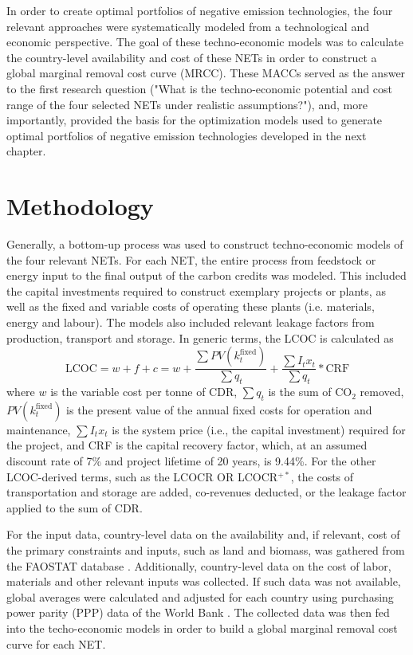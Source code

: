 In order to create optimal portfolios of negative emission technologies, the four relevant approaches were systematically modeled from a technological and economic perspective. The goal of these techno-economic models was to calculate the country-level availability and cost of these NETs in order to construct a global marginal removal cost curve (MRCC). These MACCs served as the answer to the first research question ("What is the techno-economic potential and cost range of the four selected NETs under realistic assumptions?"), and, more importantly, provided the basis for the optimization models used to generate optimal portfolios of negative emission technologies developed in the next chapter.

\section{Methodology}
Generally, a bottom-up process was used to construct techno-economic models of the four relevant NETs. For each NET, the entire process from feedstock or energy input to the final output of the carbon credits was modeled. This included the capital investments required to construct exemplary projects or plants, as well as the fixed and variable costs of operating these plants (i.e. materials, energy and labour). The models also included relevant leakage factors from production, transport and storage. In generic terms, the LCOC is calculated as
\begin{equation}
\text{LCOC} = w + f + c = w + \frac{\sum{PV(k^\text{fixed}_t)}}{\sum{q_t}} + \frac{\sum{I_tx_t}}{\sum{q_t}}*\text{CRF}
\end{equation}
where $w$ is the variable cost per tonne of CDR, $\sum{q_t}$ is the sum of CO$_2$ removed, $PV(k^\text{fixed}_t)$ is the present value of the annual fixed costs for operation and maintenance, $\sum{I_tx_t}$ is the system price (i.e., the capital investment) required for the project, and CRF is the capital recovery factor, which, at an assumed discount rate of 7\% and project lifetime of 20 years, is 9.44\%. For the other LCOC-derived terms, such as the LCOCR OR LCOCR$^{+*}$, the costs of transportation and storage are added, co-revenues deducted, or the leakage factor applied to the sum of CDR.\vspace{2mm}

For the input data, country-level data on the availability and, if relevant, cost of the primary constraints and inputs, such as land and biomass, was gathered from the FAOSTAT database \parencite{fao_faostat_2025, fao_faostat_2025-1, fao_faostat_2026}. Additionally, country-level data on the cost of labor, materials and other relevant inputs was collected. If such data was not available, global averages were calculated and adjusted for each country using purchasing power parity (PPP) data of the World Bank \parencite{world_bank_icp_2021}. The collected data was then fed into the techo-economic models in order to build a global marginal removal cost curve for each NET.

